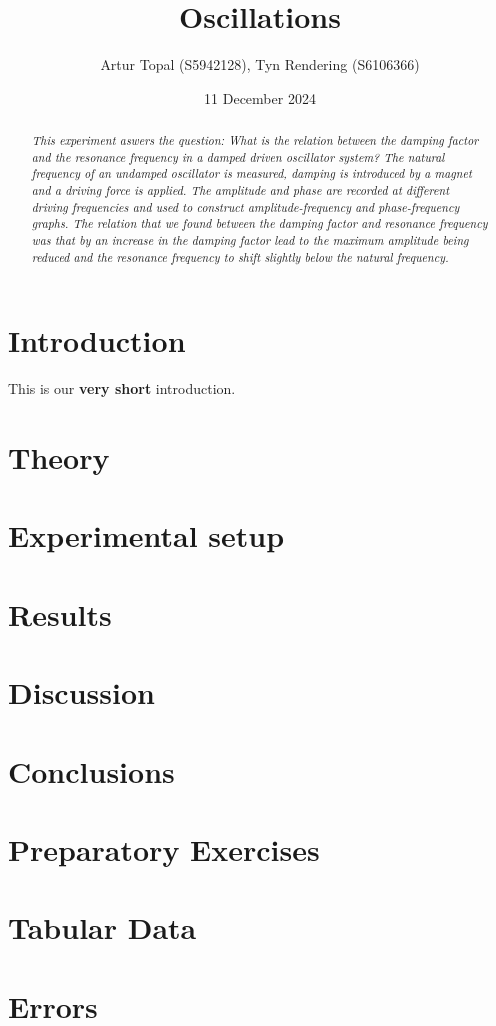 \documentclass[a4paper,12pt]{article}
\title{Oscillations}
\author{Artur Topal (S5942128), Tyn Rendering (S6106366)}
\date{11 December 2024}
\begin{document}
\maketitle

\begin{abstract}
\textit{This experiment aswers the question: What is the relation between the damping factor and the resonance frequency in a damped driven oscillator system? The natural frequency of an undamped oscillator is measured, damping is introduced by a magnet and a driving force is applied. The amplitude and phase are recorded at different driving frequencies and used to construct amplitude-frequency and phase-frequency graphs. The relation that we found between the damping factor and resonance frequency was that by an increase in the damping factor lead to the maximum amplitude being reduced and the resonance frequency to shift slightly below the natural frequency.}
\end{abstract}

\section{Introduction}
This is our \textbf{very short} introduction.

\section{Theory}


\section{Experimental setup}


\section{Results}


\section{Discussion}


\section{Conclusions}


\appendix
\section{Preparatory Exercises} \label{appendix:preps}

 
\section{Tabular Data} \label{appendix:data}


\section{Errors} \label{appendix:errors}

\end{document}

